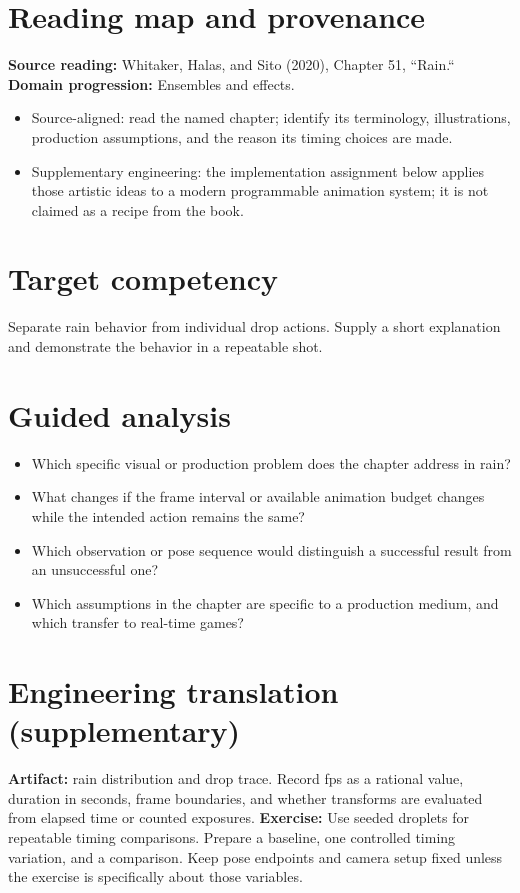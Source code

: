 \documentclass[10pt,letterpaper]{article}
\begin{document}
\makedoctitle
\makedocsummary

\section{Reading map and provenance}
\textbf{Source reading:} Whitaker, Halas, and Sito (2020), Chapter 51, ``Rain.``\\
\textbf{Domain progression:} Ensembles and effects.
\begin{itemize}
\item Source-aligned: read the named chapter; identify its terminology, illustrations, production assumptions, and the reason its timing choices are made.
\item Supplementary engineering: the implementation assignment below applies those artistic ideas to a modern programmable animation system; it is not claimed as a recipe from the book.
\end{itemize}
\section{Target competency}
Separate rain behavior from individual drop actions. Supply a short explanation and demonstrate the behavior in a repeatable shot.
\section{Guided analysis}
\begin{itemize}
\item Which specific visual or production problem does the chapter address in rain?
\item What changes if the frame interval or available animation budget changes while the intended action remains the same?
\item Which observation or pose sequence would distinguish a successful result from an unsuccessful one?
\item Which assumptions in the chapter are specific to a production medium, and which transfer to real-time games?
\end{itemize}
\section{Engineering translation (supplementary)}
\textbf{Artifact:} rain distribution and drop trace. Record fps as a rational value, duration in seconds, frame boundaries, and whether transforms are evaluated from elapsed time or counted exposures.
\textbf{Exercise:} Use seeded droplets for repeatable timing comparisons. Prepare a baseline, one controlled timing variation, and a comparison. Keep pose endpoints and camera setup fixed unless the exercise is specifically about those variables.
\end{document}
